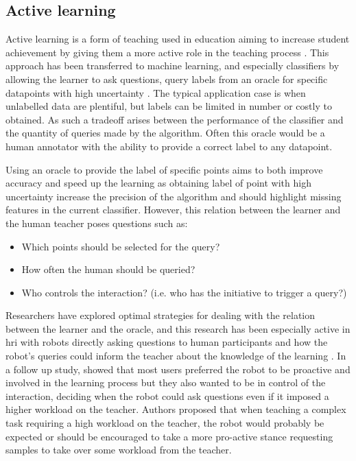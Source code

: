 \subsection{Active learning} \label{ssec:back_active}

Active learning is a form of teaching used in education aiming to increase student achievement by giving them a more active role in the teaching process \citep{johnson1991active}. This approach has been transferred to machine learning, and especially classifiers by allowing the learner to ask questions, query labels from an oracle for specific datapoints with high uncertainty \citep{settles2012active}. The typical application case is when unlabelled data are plentiful, but labels can be limited in number or costly to obtained. As such a tradeoff arises between the performance of the classifier and the quantity of queries made by the algorithm. Often this oracle would be a human annotator with the ability to provide a correct label to any datapoint.

Using an oracle to provide the label of specific points aims to both improve accuracy and speed up the learning as obtaining label of point with high uncertainty increase the precision of the algorithm and should highlight missing features in the current classifier. However, this relation between the learner and the human teacher poses questions such as: 
\begin{itemize}
	\item Which points should be selected for the query?
	\item How often the human should be queried?
	\item Who controls the interaction? (i.e. who has the initiative to trigger a query?)
\end{itemize}

Researchers have explored optimal strategies for dealing with the relation between the learner and the oracle, and this research has been especially active in \gls{hri} with robots directly asking questions to human participants and how the robot's queries could inform the teacher about the knowledge of the learning \citep{chao2010transparent}. In a follow up study, \cite{cakmak2010designing} showed that most users preferred the robot to be proactive and involved in the learning process but they also wanted to be in control of the interaction, deciding when the robot could ask questions even if it imposed a higher workload on the teacher. Authors proposed that when teaching a complex task requiring a high workload on the teacher, the robot would probably be expected or should be encouraged to take a more pro-active stance requesting samples to take over some workload from the teacher.

